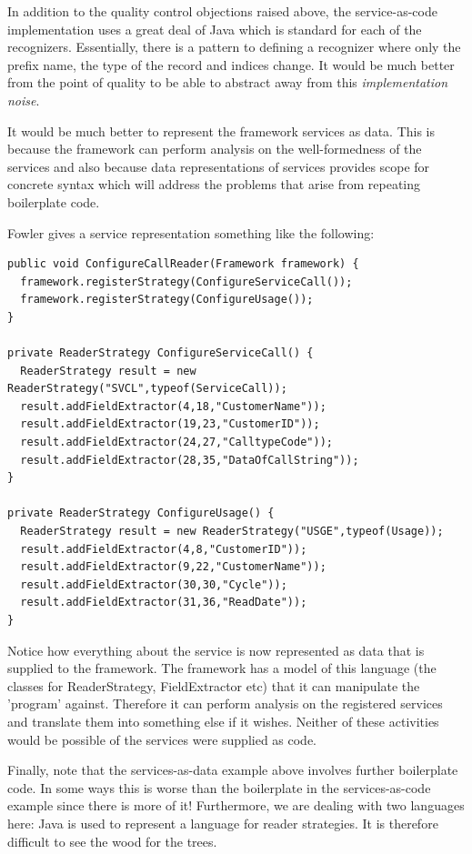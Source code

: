 In addition to the quality control objections raised above, the service-as-code 
implementation uses a great deal of Java which is standard for each of the 
recognizers. Essentially, there is a pattern to defining a recognizer where 
only the prefix name, the type of the record and indices change. It would be 
much better from the point of quality to be able to abstract away from this 
{\em implementation noise}.

It would be much better to represent the framework services as data. This is 
because the framework can perform analysis on the well-formedness of the 
services and also because data representations of services provides scope 
for concrete syntax which will address the problems that arise from repeating 
boilerplate code.

Fowler gives a service representation something like the following:
\begin{lstlisting}
public void ConfigureCallReader(Framework framework) {
  framework.registerStrategy(ConfigureServiceCall());
  framework.registerStrategy(ConfigureUsage());
}
 
private ReaderStrategy ConfigureServiceCall() {
  ReaderStrategy result = new ReaderStrategy("SVCL",typeof(ServiceCall));
  result.addFieldExtractor(4,18,"CustomerName"));
  result.addFieldExtractor(19,23,"CustomerID"));
  result.addFieldExtractor(24,27,"CalltypeCode"));
  result.addFieldExtractor(28,35,"DataOfCallString"));
}
 
private ReaderStrategy ConfigureUsage() {
  ReaderStrategy result = new ReaderStrategy("USGE",typeof(Usage));
  result.addFieldExtractor(4,8,"CustomerID"));
  result.addFieldExtractor(9,22,"CustomerName"));
  result.addFieldExtractor(30,30,"Cycle"));
  result.addFieldExtractor(31,36,"ReadDate"));
}
\end{lstlisting}
Notice how everything about the service is now represented as data that 
is supplied to the framework. The framework has a model of this language 
(the classes for ReaderStrategy, FieldExtractor etc) that it can manipulate 
the 'program' against. Therefore it can perform analysis on the registered 
services and translate them into something else if it wishes. Neither of 
these activities would be possible of the services were supplied as code.

Finally, note that the services-as-data example above involves further 
boilerplate code. In some ways this is worse than the boilerplate in the 
services-as-code example since there is more of it! Furthermore, we are 
dealing with two languages here: Java is used to represent a language for 
reader strategies. It is therefore difficult to see the wood for the trees.

